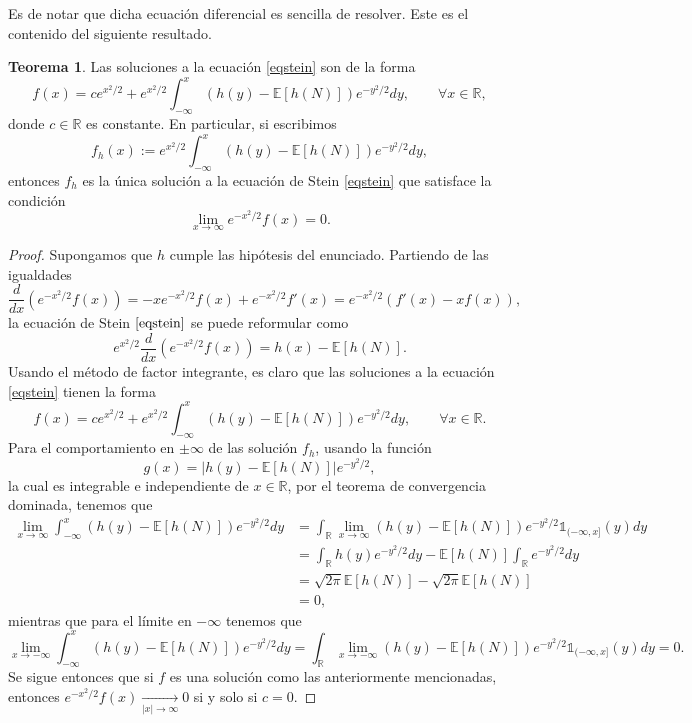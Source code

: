 \documentclass[letterpaper,twoside,12pt]{book}
\newcommand{\R}{\mathbb{R}}
\newcommand{\E}{\mathbb{E}}
\newcommand{\1}{\mathds{1}}
\newcommand{\abs}[1]{\left\lvert #1 \right\rvert}
\renewcommand{\to}{\rightarrow}
\theoremstyle{definition}
\theoremstyle{definition}
\newtheorem{teo}{Teorema}
\theoremstyle{remark}
\theoremstyle{definition}
\theoremstyle{definition}
\theoremstyle{definition}
\theoremstyle{definition}
\theoremstyle{definition}
\begin{document}
 Es de notar que dicha ecuación diferencial es sencilla de resolver. Este es el contenido del siguiente resultado.

 \begin{teo}\label{soleqstein}
  Las soluciones a la ecuación \eqref{eqstein} son de la forma 
  \[
  f(x)=ce^{x^2/2}+e^{x^2/2}\int_{-\infty}^x(h(y)-\E\left[h(N)\right])e^{-y^2/2}dy, \qquad \forall x\in \R,
  \] 
  donde $c\in \R$ es constante. En particular, si escribimos 
  \[
   f_h(x):=e^{x^2/2}\int_{-\infty}^x(h(y)-\E\left[h(N)\right])e^{-y^2/2}dy,
  \]
  entonces $f_h$ es la única solución a la ecuación de Stein \eqref{eqstein} que satisface la condición 
  \[
  \lim_{x\to \infty}e^{-x^2/2}f(x)=0.
  \]
  \end{teo}
  \begin{proof} 
    Supongamos que $h$ cumple las hipótesis del enunciado. Partiendo de las igualdades 
    \[
    \frac{d}{dx}\left(e^{-x^2/2}f(x)\right)=-xe^{-x^2/2}f(x)+e^{-x^2/2}f'(x)=e^{-x^2/2}(f'(x)-xf(x)),
    \]
    la ecuación de Stein $\eqref{eqstein}$ se puede reformular como 
    \[
      e^{x^2/2}\frac{d}{dx}\left(e^{-x^2/2}f(x)\right)=h(x)-\E\left[h(N)\right].
    \] 
    Usando el método de factor integrante, es claro que las soluciones a la ecuación  \eqref{eqstein} tienen la forma 
    \begin{equation*}
      f(x)=ce^{x^2/2}+e^{x^2/2}\int_{-\infty}^{x}(h(y)-\E\left[h(N)\right])e^{-y^2/2}dy, \qquad \forall x\in \R.
    \end{equation*}
   Para el comportamiento en $\pm\infty$ de las solución $f_h$, usando la función 
   \[
   g(x)=\abs{h(y)-\E\left[h(N)\right]}e^{-y^2/2},
   \]
   la cual es integrable e independiente de $x\in \R$, por el teorema de convergencia dominada, tenemos que
   \begin{align*}
      \lim_{x\to \infty}\int_{-\infty}^x \left(h(y)-\E\left[h(N)\right]\right)e^{-y^2/2}dy&=\int_\R\lim_{x\to\infty}\left(h(y)-\E\left[h(N)\right]\right)e^{-y^2/2}\1_{(-\infty,x]}(y)dy\\
      &=\int_\R h(y)e^{-y^2/2}dy-\E\left[h(N)\right]\int_\R e^{-y^2/2}dy\\
      &=\sqrt{2\pi}\E\left[h(N)\right]-\sqrt{2\pi}\E\left[h(N)\right]\\
      &=0,
      \end{align*}
      mientras que para el límite en $-\infty$ tenemos que 
      \[
         \lim_{x\to -\infty}\int_{-\infty}^x \left(h(y)-\E\left[h(N)\right]\right)e^{-y^2/2}dy=\int_\R\lim_{x\to-\infty}\left(h(y)-\E\left[h(N)\right]\right)e^{-y^2/2}\1_{(-\infty,x]}(y)dy=0.
      \]
      Se sigue entonces que si $f$ es una solución como las anteriormente mencionadas, entonces $e^{-x^2/2}f(x)\xrightarrow[|x|\to\infty]{}0$ si y solo si $c=0$.
   \end{proof}
\end{document}
